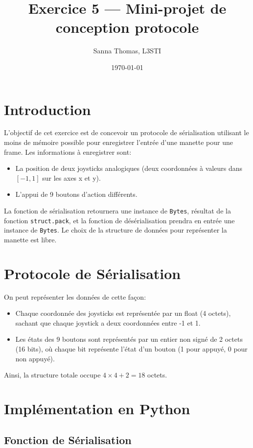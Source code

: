 \documentclass{article}
\title{Exercice 5 — Mini-projet de conception protocole}
\author{Sanna Thomas, L3STI}
\date{\today}
\begin{document}
\maketitle

\section{Introduction}

L'objectif de cet exercice est de concevoir un protocole de sérialisation utilisant le moins de mémoire possible pour enregistrer l'entrée d'une manette pour une frame. Les informations à enregistrer sont:
\begin{itemize}
    \item La position de deux joysticks analogiques (deux coordonnées à valeurs dans $[-1, 1]$ sur les axes x et y).
    \item L'appui de 9 boutons d'action différents.
\end{itemize}

La fonction de sérialisation retournera une instance de \texttt{Bytes}, résultat de la fonction \texttt{struct.pack}, et la fonction de désérialisation prendra en entrée une instance de \texttt{Bytes}. Le choix de la structure de données pour représenter la manette est libre.

\section{Protocole de Sérialisation}

On peut représenter les données de cette façon:
\begin{itemize}
    \item Chaque coordonnée des joysticks est représentée par un float (4 octets), sachant que chaque joystick a deux coordonnées entre -1 et 1.
    \item Les états des 9 boutons sont représentés par un entier non signé de 2 octets (16 bits), où chaque bit représente l'état d'un bouton (1 pour appuyé, 0 pour non appuyé).
\end{itemize}

Ainsi, la structure totale occupe $4 \times 4 + 2 = 18$ octets.

\section{Implémentation en Python}

\subsection{Fonction de Sérialisation}
\end{document}
